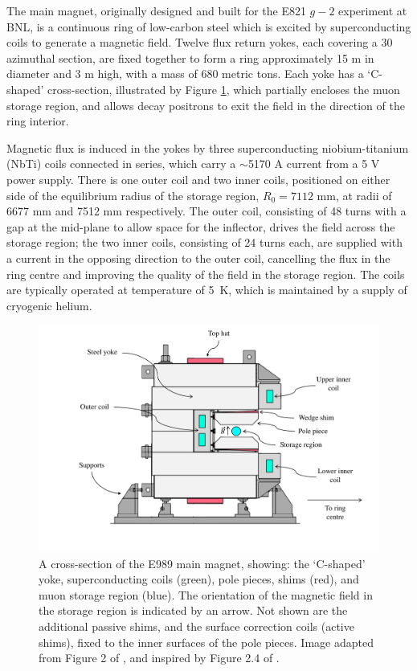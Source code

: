 The main magnet, originally designed and built for the E821 $g-2$ experiment at BNL, is a continuous ring of low-carbon steel which is excited by superconducting coils to generate a magnetic field. Twelve flux return yokes, each covering a 30{\degree} azimuthal section, are fixed together to form a ring approximately 15 m in diameter and 3 m high, with a mass of 680 metric tons. Each yoke has a `C-shaped' cross-section, illustrated by Figure \ref{fig:Magnet}, which partially encloses the muon storage region, and allows decay positrons to exit the field in the direction of the ring interior. 

Magnetic flux is induced in the yokes by three superconducting niobium-titanium (NbTi) coils connected in series, which carry a $\sim$5170 A current from a 5 V power supply. There is one outer coil and two inner coils, positioned on either side of the equilibrium radius of the storage region, $R_{0}=7112$ mm, at radii of 6677 mm and 7512 mm respectively. The outer coil, consisting of 48 turns with a gap at the mid-plane to allow space for the inflector, drives the field across the storage region; the two inner coils, consisting of 24 turns each, are supplied with a current in the opposing direction to the outer coil, cancelling the flux in the ring centre and improving the quality of the field in the storage region. The coils are typically operated at temperature of \SI{5}{\kelvin}, which is maintained by a supply of cryogenic helium.
%
\begin{figure}[t!]
\centering{}
\includegraphics[trim={0 0 0 0},clip,width=\textwidth]{Images/Chapter3/BNLMagnetCrossSection4.pdf}
\caption{A cross-section of the E989 main magnet, showing: the `C-shaped' yoke, superconducting coils (green), pole pieces, shims (red), and muon storage region (blue). The orientation of the magnetic field in the storage region is indicated by an arrow. Not shown are the additional passive shims, and the surface correction coils (active shims), fixed to the inner surfaces of the pole pieces. Image adapted from Figure 2 of \cite{BNLMagnet}, and inspired by Figure 2.4 of \cite{Sweigart}.}
\label{fig:Magnet}
\end{figure} 

